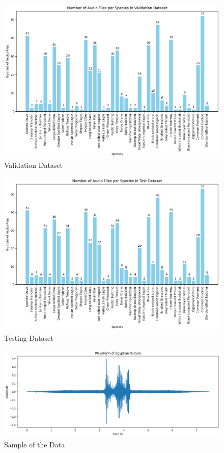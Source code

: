 \begin{figure}[h!]
    \centering
    \includegraphics[scale=0.4]{images/ValidationDataset.png}
    \caption{Validation Dataset}
\end{figure}
\newpage
\begin{figure}[h!]
    \centering
    \includegraphics[scale=0.45]{images/TestDataset.png}
    \caption{Testing Dataset}
\end{figure}
\hspace{3.5cm}
\begin{figure}[h!]
    \centering
    \includegraphics[scale=0.38]{images/SampleData.png}
    \caption{Sample of the Data}
\end{figure}
\newpage
